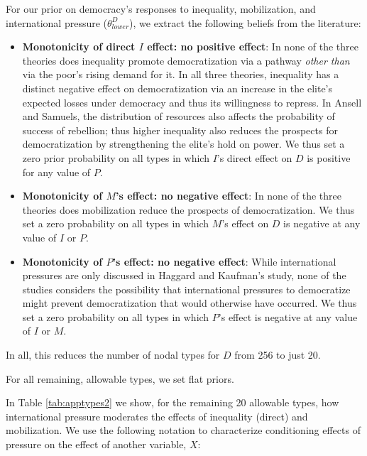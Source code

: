 \documentclass[
  12pt,
]{book}
\begin{document}
For our prior on democracy's responses to inequality, mobilization, and international pressure (\(\theta^D_{lower}\)), we extract the following beliefs from the literature:

\begin{itemize}
\item
  \textbf{Monotonicity of direct \(I\) effect: no positive effect}: In none of the three theories does inequality promote democratization via a pathway \emph{other than} via the poor's rising demand for it. In all three theories, inequality has a distinct negative effect on democratization via an increase in the elite's expected losses under democracy and thus its willingness to repress. In Ansell and Samuels, the distribution of resources also affects the probability of success of rebellion; thus higher inequality also reduces the prospects for democratization by strengthening the elite's hold on power. We thus set a zero prior probability on all types in which \(I\)'s direct effect on \(D\) is positive for any value of \(P\).
\item
  \textbf{Monotonicity of \(M\)'s effect: no negative effect}: In none of the three theories does mobilization reduce the prospects of democratization. We thus set a zero probability on all types in which \(M\)'s effect on \(D\) is negative at any value of \(I\) or \(P\).
\item
  \textbf{Monotonicity of \(P\)'s effect: no negative effect}: While international pressures are only discussed in Haggard and Kaufman's study, none of the studies considers the possibility that international pressures to democratize might prevent democratization that would otherwise have occurred. We thus set a zero probability on all types in which \(P\)'s effect is negative at any value of \(I\) or \(M\).
\end{itemize}

In all, this reduces the number of nodal types for \(D\) from 256 to just 20.

For all remaining, allowable types, we set flat priors.

In Table \ref{tab:apptypes2} we show, for the remaining 20 allowable types, how international pressure moderates the effects of inequality (direct) and mobilization. We use the following notation to characterize conditioning effects of pressure on the effect of another variable, \(X\):
\end{document}
